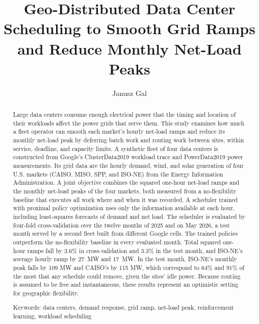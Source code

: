 \documentclass{UNCC-thesis}
\begin{document}
\fbmatterchapterformat
{}
\title{Geo-Distributed Data Center Scheduling to Smooth Grid Ramps and Reduce Monthly Net-Load Peaks}
\author{Janusz Gal}

\maketitlepage
\makecopyright

\begin{abstract}
Large data centers consume enough electrical power that the timing and location of their
workloads affect the power grids that serve them. This study examines how much a fleet operator
can smooth each market's hourly net-load ramps and reduce its monthly net-load peak by deferring
batch work and routing work between sites, within service, deadline, and capacity limits. A
synthetic fleet of four data centers is constructed from Google's ClusterData2019 workload trace
and PowerData2019 power measurements. Its grid data are the hourly demand, wind, and solar
generation of four U.S. markets (CAISO, MISO, SPP, and ISO-NE) from the Energy Information
Administration. A joint objective combines the squared one-hour net-load ramps and
the monthly net-load peaks of the four markets, both measured from a no-flexibility baseline that
executes all work where and when it was recorded. A scheduler trained with proximal policy
optimization uses only the information available at each hour, including least-squares forecasts
of demand and net load. The scheduler is evaluated by four-fold cross-validation over the twelve
months of 2025 and on May 2026, a test month served by a second fleet built from different Google
cells. The trained policies outperform the no-flexibility baseline in every evaluated month. Total
squared one-hour ramps fall by 3.6\% in cross-validation and 3.3\% in the test month, and ISO-NE's
average hourly ramp by 27~MW and 17~MW. In the test
month, ISO-NE's monthly peak falls by 109 MW and CAISO's by 115 MW, which correspond to 64\% and
91\% of the most that any schedule could remove, given the sites' idle power. Because routing is
assumed to be free and instantaneous, these results represent an optimistic setting for geographic
flexibility.

\noindent Keywords: data centers, demand response, grid ramp, net-load peak,
reinforcement learning, workload scheduling
\end{abstract}

\tableofcontents
\listoftables
\listoffigures
\end{document}
